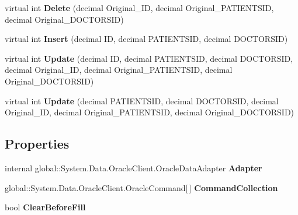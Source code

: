 \begin{CompactItemize}
\item 
virtual int \textbf{Delete} (decimal Original\_\-ID, decimal Original\_\-PATIENTSID, decimal Original\_\-DOCTORSID)\label{class_automatic_medical_system_1_1_data_set2_table_adapters_1_1_f_a_m_i_l_y___d_o_c_t_o_r_table_adapter_13facb6f30febb4605464e32779daa19}

\item 
virtual int \textbf{Insert} (decimal ID, decimal PATIENTSID, decimal DOCTORSID)\label{class_automatic_medical_system_1_1_data_set2_table_adapters_1_1_f_a_m_i_l_y___d_o_c_t_o_r_table_adapter_1504b7e2547f4db8f970493601241412}

\item 
virtual int \textbf{Update} (decimal ID, decimal PATIENTSID, decimal DOCTORSID, decimal Original\_\-ID, decimal Original\_\-PATIENTSID, decimal Original\_\-DOCTORSID)\label{class_automatic_medical_system_1_1_data_set2_table_adapters_1_1_f_a_m_i_l_y___d_o_c_t_o_r_table_adapter_9dfc4cc4101723ba96be98a42f5f895e}

\item 
virtual int \textbf{Update} (decimal PATIENTSID, decimal DOCTORSID, decimal Original\_\-ID, decimal Original\_\-PATIENTSID, decimal Original\_\-DOCTORSID)\label{class_automatic_medical_system_1_1_data_set2_table_adapters_1_1_f_a_m_i_l_y___d_o_c_t_o_r_table_adapter_b5ab2323c56c17efd676a76303e80052}

\end{CompactItemize}
\subsection*{Properties}
\begin{CompactItemize}
\item 
internal global::System.Data.OracleClient.OracleDataAdapter \textbf{Adapter}\hspace{0.3cm}{\tt  [get]}\label{class_automatic_medical_system_1_1_data_set2_table_adapters_1_1_f_a_m_i_l_y___d_o_c_t_o_r_table_adapter_7e0d0baea8e0aaa4a8a08886fdf7af3a}

\item 
global::System.Data.OracleClient.OracleCommand[$\,$] \textbf{CommandCollection}\hspace{0.3cm}{\tt  [get]}\label{class_automatic_medical_system_1_1_data_set2_table_adapters_1_1_f_a_m_i_l_y___d_o_c_t_o_r_table_adapter_523a6d5231c70af5df52a85f9716a98a}

\item 
bool \textbf{ClearBeforeFill}\hspace{0.3cm}{\tt  [get, set]}\label{class_automatic_medical_system_1_1_data_set2_table_adapters_1_1_f_a_m_i_l_y___d_o_c_t_o_r_table_adapter_fe5db3c2e2f2f22bf0d60a69b01ff497}

\end{CompactItemize}


